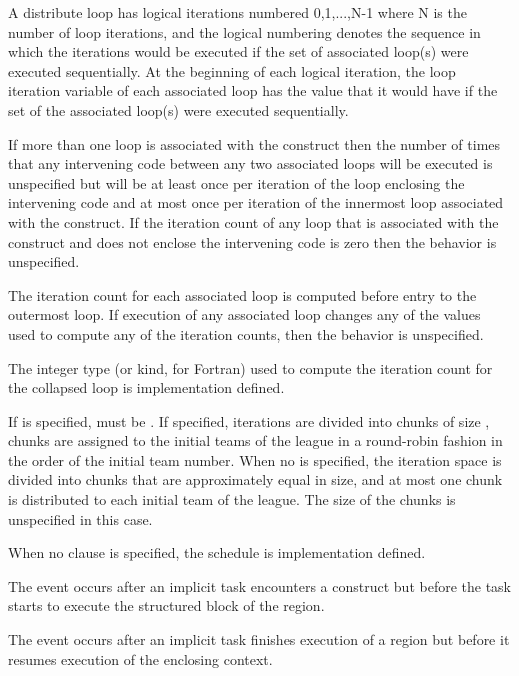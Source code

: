 A distribute loop has logical iterations numbered 0,1,...,N-1 where N
is the number of loop iterations, and the logical numbering denotes
the sequence in which the iterations would be executed if the set of
associated loop(s) were executed sequentially.  At the beginning of
each logical iteration, the loop iteration variable of each associated
loop has the value that it would have if the set of the associated
loop(s) were executed sequentially.

If more than one loop is associated with the 
construct then the number of times that any intervening code between
any two associated loops will be executed is unspecified but will be
at least once per iteration of the loop enclosing the intervening code
and at most once per iteration of the innermost loop associated with
the construct.  If the iteration count of any loop that is associated with the
 construct and does not enclose the intervening code is zero
then the behavior is unspecified.


The iteration count for each associated loop is computed before entry to the outermost loop. If execution of any associated loop changes any of the values used to compute any of the iteration counts, then the behavior is unspecified.

The integer type (or kind, for Fortran) used to compute the iteration count for the collapsed loop is implementation defined.

If  is specified,  must be . If specified, iterations are
divided into chunks of size , chunks are assigned to the
initial teams of the league in
a round-robin fashion in the order of the initial team number. When no  is specified,
the iteration space is divided into chunks that are approximately equal in size, and at
most one chunk is distributed to each initial team of the league. The size of the
chunks is unspecified in this case.

When no  clause is specified, the schedule is implementation defined.

\events

The  event occurs after an implicit task encounters a
 construct but before the task starts to execute the structured
block of the  region.

The  event occurs after an implicit task finishes execution of 
a  region but before it resumes execution of the enclosing context.

